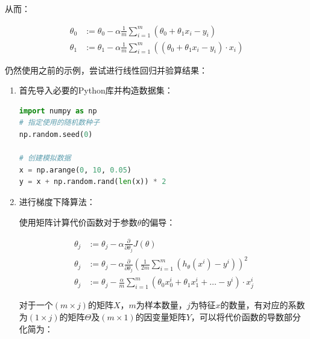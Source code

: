 \documentclass[12pt, a4paper]{article}
\begin{document}
从而：

\begin{align*}
    \theta_0 & :=\theta_0-\alpha\frac{1}{m}\sum_{i=1}^{m}(\theta_0+\theta_1x_i-y_i)            \\
    \theta_1 & :=\theta_1-\alpha\frac{1}{m}\sum_{i=1}^{m}((\theta_0+\theta_1x_i-y_i)\cdot x_i)
\end{align*}

仍然使用之前的示例，尝试进行线性回归并验算结果：

\begin{enumerate}
    \item 
          首先导入必要的Python库并构造数据集：
          
          \begin{lstlisting}[language=Python]
import numpy as np
# 指定使用的随机数种子
np.random.seed(0)

# 创建模拟数据
x = np.arange(0, 10, 0.05)
y = x + np.random.rand(len(x)) * 2
               \end{lstlisting}
          
    \item 
          进行梯度下降算法：
          
          使用矩阵计算代价函数对于参数$\theta$的偏导：
          
          \begin{align*}
              \theta_j & :=\theta_j-\alpha\frac{\partial}{\partial\theta_j}J(\theta)                                         \\
              \theta_j & :=\theta_j-\alpha\frac{\partial}{\partial\theta_j}(\frac{1}{2m}\sum_{i=1}^{m}(h_\theta(x^i)-y^i))^2 \\
              \theta_j & :=\theta_j-\frac{\alpha}{m}\sum_{i=1}^{m}(\theta_0x_0^i+\theta_1x_1^i+\dots-y^i)\cdot x_j^i
          \end{align*}
          
          对于一个$(m\times j)$的矩阵$X$，$m$为样本数量，$j$为特征$x$的数量，有对应的系数为$(1\times j)$的矩阵$\Theta$及$(m\times 1)$的因变量矩阵$Y$，可以将代价函数的导数部分化简为：
          

\end{enumerate}
\end{document}
